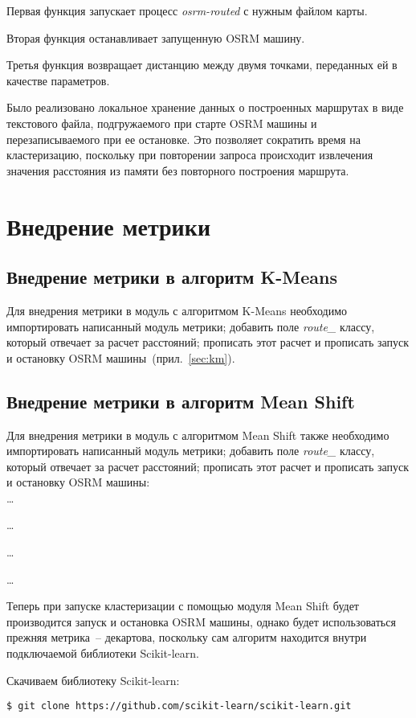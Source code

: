Первая функция запускает процесс \emph{osrm-routed} с нужным файлом карты.

Вторая функция останавливает запущенную OSRM машину.

Третья функция возвращает дистанцию между двумя точками, пе\-ре\-дан\-ных ей в качестве параметров.

Было реализовано локальное хранение данных о построенных маршрутах в виде текстового файла,
подгружаемого при старте OSRM машины и перезаписываемого при ее остановке. Это позволяет сократить
время на кластеризацию, поскольку при повторении запроса происходит извлечения значения расстояния
из памяти без повторного построения маршрута.

\newpage

\chapter{Внедрение метрики}
\section{Внедрение метрики в алгоритм K-Means}
Для внедрения метрики в модуль с алгоритмом K-Means необходимо импортировать написанный
мо\-дуль метрики; добавить поле \emph{route\_} классу, который отвечает за расчет расстояний;
прописать этот расчет и прописать запуск и остановку OSRM машины~(прил.~\ref{sec:km}).

\section{Внедрение метрики в алгоритм Mean Shift}
Для внедрения метрики в модуль с алгоритмом Mean Shift также необходимо импортировать написанный
мо\-дуль метрики; добавить поле \emph{route\_} классу, который отвечает за расчет расстояний;
прописать этот расчет и прописать запуск и остановку OSRM машины:\\
\ldots

\ldots

\ldots

\ldots

Теперь при запуске кластеризации с помощью модуля Mean Shift будет производится запуск и остановка
OSRM машины, однако будет использоваться прежняя метрика~-- декартова, поскольку сам алгоритм
находится внутри подключаемой библиотеки Scikit-learn.

Скачиваем библиотеку Scikit-learn:
\begin{lstlisting}
$ git clone https://github.com/scikit-learn/scikit-learn.git
\end{lstlisting}

